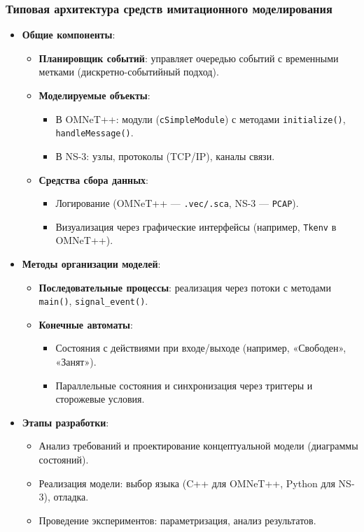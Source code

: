 \subsubsection*{Типовая архитектура средств имитационного моделирования}
\begin{itemize}
    \item \textbf{Общие компоненты}:
    \begin{itemize}
        \item \textbf{Планировщик событий}: управляет очередью событий с временными метками (дискретно-событийный подход).
        \item \textbf{Моделируемые объекты}:
        \begin{itemize}
            \item В OMNeT++: модули (\texttt{cSimpleModule}) с методами \texttt{initialize()}, \texttt{handleMessage()}.
            \item В NS-3: узлы, протоколы (TCP/IP), каналы связи.
        \end{itemize}
        \item \textbf{Средства сбора данных}:
        \begin{itemize}
            \item Логирование (OMNeT++ — \texttt{.vec/.sca}, NS-3 — \texttt{PCAP}).
            \item Визуализация через графические интерфейсы (например, \texttt{Tkenv} в OMNeT++).
        \end{itemize}
    \end{itemize}

    \item \textbf{Методы организации моделей}:
    \begin{itemize}
        \item \textbf{Последовательные процессы}: реализация через потоки с методами \texttt{main()}, \texttt{signal\_event()}.
        \item \textbf{Конечные автоматы}:
        \begin{itemize}
            \item Состояния с действиями при входе/выходе (например, «Свободен», «Занят»).
            \item Параллельные состояния и синхронизация через триггеры и сторожевые условия.
        \end{itemize}
    \end{itemize}

    \item \textbf{Этапы разработки}:
    \begin{itemize}
        \item Анализ требований и проектирование концептуальной модели (диаграммы состояний).
        \item Реализация модели: выбор языка (C++ для OMNeT++, Python для NS-3), отладка.
        \item Проведение экспериментов: параметризация, анализ результатов.
    \end{itemize}
\end{itemize}

